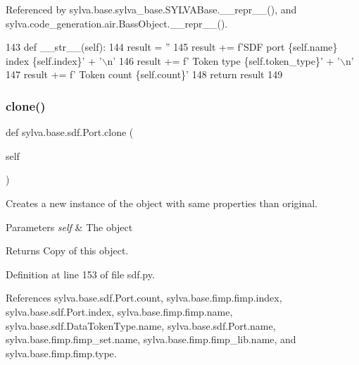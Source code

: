 Referenced by sylva.\+base.\+sylva\+\_\+base.\+S\+Y\+L\+V\+A\+Base.\+\_\+\+\_\+repr\+\_\+\+\_\+(), and sylva.\+code\+\_\+generation.\+air.\+Bass\+Object.\+\_\+\+\_\+repr\+\_\+\+\_\+().


\begin{DoxyCode}
143     \textcolor{keyword}{def }\_\_str\_\_(self):
144         result = \textcolor{stringliteral}{''}
145         result += f\textcolor{stringliteral}{'SDF port \{self.name\} index \{self.index\}'} + \textcolor{stringliteral}{'\(\backslash\)n'}
146         result += f\textcolor{stringliteral}{'  Token type  \{self.token\_type\}'} + \textcolor{stringliteral}{'\(\backslash\)n'}
147         result += f\textcolor{stringliteral}{'  Token count \{self.count\}'}
148         \textcolor{keywordflow}{return} result
149 
\end{DoxyCode}
\mbox{\label{classsylva_1_1base_1_1sdf_1_1_port_ad0192710d76f8b2b3fefeef6e49f49bd}} 
\subsubsection{\texorpdfstring{clone()}{clone()}}
{\footnotesize\ttfamily def sylva.\+base.\+sdf.\+Port.\+clone (\begin{DoxyParamCaption}\item[{}]{self }\end{DoxyParamCaption})}



Creates a new instance of the object with same properties than original. 


\begin{DoxyParams}{Parameters}
{\em self} & The object\\
\hline
\end{DoxyParams}
\begin{DoxyReturn}{Returns}
Copy of this object. 
\end{DoxyReturn}


Definition at line 153 of file sdf.\+py.



References sylva.\+base.\+sdf.\+Port.\+count, sylva.\+base.\+fimp.\+fimp.\+index, sylva.\+base.\+sdf.\+Port.\+index, sylva.\+base.\+fimp.\+fimp.\+name, sylva.\+base.\+sdf.\+Data\+Token\+Type.\+name, sylva.\+base.\+sdf.\+Port.\+name, sylva.\+base.\+fimp.\+fimp\+\_\+set.\+name, sylva.\+base.\+fimp.\+fimp\+\_\+lib.\+name, and sylva.\+base.\+fimp.\+fimp.\+type.


